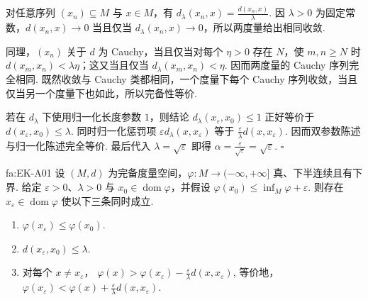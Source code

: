 \begin{FAProof}
对任意序列 \(\displaystyle(x_n)\subseteq M\) 与 \(\displaystyle x\in M\)，有 \(\displaystyle d_\lambda(x_n,x)=\frac{d(x_n,x)}{\lambda}\). 因 \(\displaystyle\lambda>0\) 为固定常数，\(\displaystyle d(x_n,x)\to0\) 当且仅当 \(\displaystyle d_\lambda(x_n,x)\to0\)，所以两度量给出相同收敛.

同理，\(\displaystyle(x_n)\) 关于 \(\displaystyle d\) 为 Cauchy，当且仅当对每个 \(\displaystyle\eta>0\) 存在 \(\displaystyle N\)，使 \(\displaystyle m,n\geqslant N\) 时 \(\displaystyle d(x_m,x_n)<\lambda\eta\)；这又当且仅当 \(\displaystyle d_\lambda(x_m,x_n)<\eta\). 因而两度量的 Cauchy 序列完全相同. 既然收敛与 Cauchy 类都相同，一个度量下每个 Cauchy 序列收敛，当且仅当另一个度量下也如此，所以完备性等价.

若在 \(\displaystyle d_\lambda\) 下使用归一化长度参数 \(\displaystyle1\)，则结论 \(\displaystyle d_\lambda(x_\varepsilon,x_0)\leqslant1\) 正好等价于 \(\displaystyle d(x_\varepsilon,x_0)\leqslant\lambda\). 同时归一化惩罚项 \(\displaystyle\varepsilon d_\lambda(x,x_\varepsilon)\) 等于 \(\displaystyle\frac{\varepsilon}{\lambda}d(x,x_\varepsilon)\). 因而双参数陈述与归一化陈述完全等价. 最后代入 \(\displaystyle\lambda=\sqrt{\varepsilon}\) 即得 \(\displaystyle\alpha=\frac{\varepsilon}{\sqrt{\varepsilon}}=\sqrt{\varepsilon}\).
\hfill\(\square\)
\end{FAProof}

\begin{FATheorem}{fa:EK-A01}
设 \(\displaystyle(M,d)\) 为完备度量空间，\(\displaystyle\varphi:M\to(-\infty,+\infty]\) 真、下半连续且有下界. 给定 \(\displaystyle\varepsilon>0\)、\(\displaystyle\lambda>0\) 与 \(\displaystyle x_0\in\operatorname{dom}\varphi\)，并假设
\(\displaystyle \varphi(x_0) \leqslant \inf_M\varphi+\varepsilon\).
则存在 \(\displaystyle x_\varepsilon\in\operatorname{dom}\varphi\) 使以下三条同时成立.
\begin{enumerate}
\item \(\displaystyle\varphi(x_\varepsilon)\leqslant\varphi(x_0)\).
\item \(\displaystyle d(x_\varepsilon,x_0)\leqslant\lambda\).
\item 对每个 \(\displaystyle x\neq x_\varepsilon\)，
\(\displaystyle \varphi(x) > \varphi(x_\varepsilon) - \frac{\varepsilon}{\lambda}d(x,x_\varepsilon)\),
等价地，
\(\displaystyle \varphi(x_\varepsilon) < \varphi(x) + \frac{\varepsilon}{\lambda}d(x,x_\varepsilon)\).
\end{enumerate}
\end{FATheorem}


